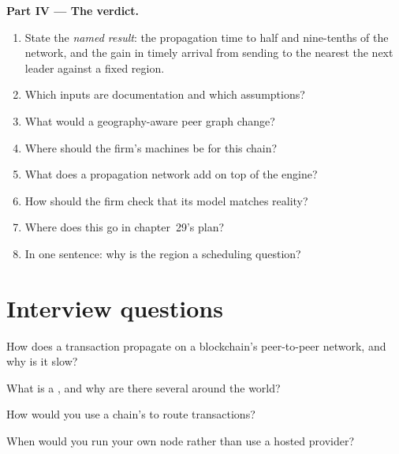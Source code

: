 \begin{problem}
\medskip\noindent\textbf{Part IV --- The verdict.}
\begin{enumerate}[resume]
\item State the \emph{named result}: the propagation time to half and nine-tenths of the network, and the gain in timely arrival from sending to the
   nearest the next leader against a fixed region.
\item Which inputs are documentation and which assumptions?
\item What would a geography-aware peer graph change?
\item Where should the firm's machines be for this chain?
\item What does a propagation network add on top of the engine?
\item How should the firm check that its model matches reality?
\item Where does this go in chapter~29's plan?
\item In one sentence: why is the region a scheduling question?
\end{enumerate}
\end{problem}

\section{Interview questions}

\begin{interviewq}\label{iq:nw:on-chain-connectivity:1}
How does a transaction propagate on a blockchain's peer-to-peer network, and why is it slow?
\end{interviewq}

\begin{interviewq}\label{iq:nw:on-chain-connectivity:2}
What is a , and why are there several around the world?
\end{interviewq}

\begin{interviewq}\label{iq:nw:on-chain-connectivity:3}
How would you use a chain's  to route transactions?
\end{interviewq}

\begin{interviewq}\label{iq:nw:on-chain-connectivity:4}
When would you run your own node rather than use a hosted provider?
\end{interviewq}

